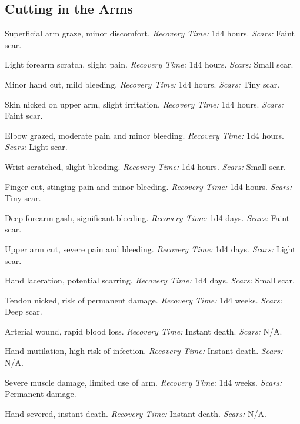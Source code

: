 \documentclass[12pt]{book}  %
\begin{document}
\subsection{Cutting in the Arms}

\begin{description}[labelwidth=1.5em, leftmargin=*, itemsep=0.4em]
    \item[01 -] Superficial arm graze, minor discomfort. \textit{Recovery Time:} 1d4 hours. \textit{Scars:} Faint scar.
    \item[02 -] Light forearm scratch, slight pain. \textit{Recovery Time:} 1d4 hours. \textit{Scars:} Small scar.
    \item[03 -] Minor hand cut, mild bleeding. \textit{Recovery Time:} 1d4 hours. \textit{Scars:} Tiny scar.
    \item[04 -] Skin nicked on upper arm, slight irritation. \textit{Recovery Time:} 1d4 hours. \textit{Scars:} Faint scar.
    \item[05 -] Elbow grazed, moderate pain and minor bleeding. \textit{Recovery Time:} 1d4 hours. \textit{Scars:} Light scar.
    \item[06 -] Wrist scratched, slight bleeding. \textit{Recovery Time:} 1d4 hours. \textit{Scars:} Small scar.
    \item[07 -] Finger cut, stinging pain and minor bleeding. \textit{Recovery Time:} 1d4 hours. \textit{Scars:} Tiny scar.
    \item[08 -] Deep forearm gash, significant bleeding. \textit{Recovery Time:} 1d4 days. \textit{Scars:} Faint scar.
    \item[09 -] Upper arm cut, severe pain and bleeding. \textit{Recovery Time:} 1d4 days. \textit{Scars:} Light scar.
    \item[10 -] Hand laceration, potential scarring. \textit{Recovery Time:} 1d4 days. \textit{Scars:} Small scar.
    \item[11 -] Tendon nicked, risk of permanent damage. \textit{Recovery Time:} 1d4 weeks. \textit{Scars:} Deep scar.
    \item[12 -] Arterial wound, rapid blood loss. \textit{Recovery Time:} Instant death. \textit{Scars:} N/A.
    \item[13 -] Hand mutilation, high risk of infection. \textit{Recovery Time:} Instant death. \textit{Scars:} N/A.
    \item[14 -] Severe muscle damage, limited use of arm. \textit{Recovery Time:} 1d4 weeks. \textit{Scars:} Permanent damage.
    \item[15 -] Hand severed, instant death. \textit{Recovery Time:} Instant death. \textit{Scars:} N/A.

\end{description}
\end{document}
